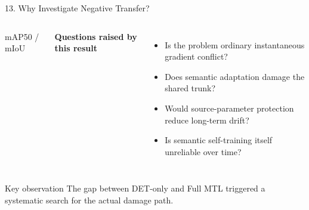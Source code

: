 \documentclass[aspectratio=169,11pt]{beamer}
\begin{document}
\begin{frame}{13. Why Investigate Negative Transfer?}
\begin{columns}[T]
{\scriptsize mAP50 / mIoU}


\textbf{Questions raised by this result}

\begin{itemize}
    \item Is the problem ordinary instantaneous gradient conflict?
    \item Does semantic adaptation damage the shared trunk?
    \item Would source-parameter protection reduce long-term drift?
    \item Is semantic self-training itself unreliable over time?
\end{itemize}

\end{columns}

\vspace{0.4em}

\begin{block}{Key observation}
The gap between DET-only and Full MTL triggered a systematic search
for the actual damage path.
\end{block}

\end{frame}
\end{document}
